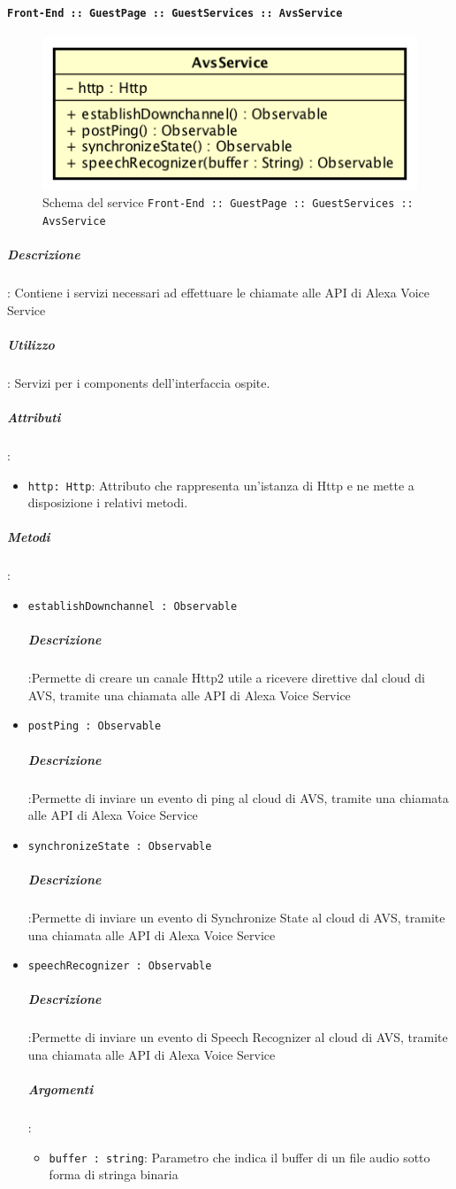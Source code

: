 \documentclass[../DefinizioneDiProdotto_v3.0.0.tex]{subfiles}
\begin{document}
			\newpage
			\paragraph{\texttt{Front-End :: GuestPage :: GuestServices :: AvsService}}
			\acapo
			\begin{figure}[!h]
				\centering
				\includegraphics[scale=0.7]{Architettura/Front-End/GuestPage/GuestServices/AvsService.png}
				\caption{Schema del service \texttt{Front-End :: GuestPage :: GuestServices :: AvsService}}
			\end{figure}

				\subparagraph{Descrizione}: Contiene i servizi necessari ad effettuare le chiamate alle API di Alexa Voice Service
				\subparagraph{Utilizzo}: Servizi per i components dell'interfaccia ospite.
				\subparagraph{Attributi}:
				\begin{itemize}
					\item \texttt{http: Http}: Attributo che rappresenta un'istanza di Http e ne mette a disposizione i relativi metodi.
				\end{itemize}
				\subparagraph{Metodi}:
				\begin{itemize}
					\item \texttt{establishDownchannel : Observable}
					\subparagraph{Descrizione}:Permette di creare un canale Http2 utile a ricevere direttive dal cloud di AVS, tramite una chiamata alle API di Alexa Voice Service

					\item \texttt{postPing : Observable}
					\subparagraph{Descrizione}:Permette di inviare un evento di ping al cloud di AVS, tramite una chiamata alle API di Alexa Voice Service

					\item \texttt{synchronizeState : Observable}
					\subparagraph{Descrizione}:Permette di inviare un evento di Synchronize State al cloud di AVS, tramite una chiamata alle API di Alexa Voice Service

					\item \texttt{speechRecognizer : Observable}
					\subparagraph{Descrizione}:Permette di inviare un evento di Speech Recognizer al cloud di AVS, tramite una chiamata alle API di Alexa Voice Service
					\subparagraph{Argomenti}:
					\begin{itemize}
						\item \texttt{buffer : string}: Parametro che indica il buffer di un file audio sotto forma di stringa binaria
					\end{itemize}
      			\end{itemize}
\end{document}
